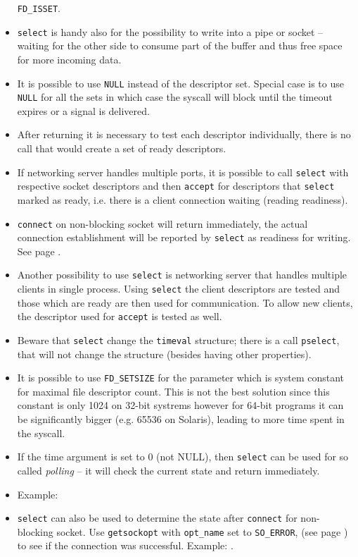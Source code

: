 \begin{itemize}
\texttt{FD\_ISSET}.
\item \texttt{select} is handy also for the possibility to write into a pipe or
socket -- waiting for the other side to consume part of the buffer and thus free
space for more incoming data.
\item It is possible to use \texttt{NULL} instead of the descriptor set. Special
case is to use \texttt{NULL} for all the sets in which case the syscall will
block until the timeout expires or a signal is delivered.
\item After returning it is necessary to test each descriptor individually,
there is no call that would create a set of ready descriptors.
\item If networking server handles multiple ports, it is possible to call
\texttt{select} with respective socket descriptors and then \texttt{accept}
for descriptors that \texttt{select} marked as ready, i.e. there is a client
connection waiting (reading readiness).
\item \texttt{connect} on non-blocking socket will return immediately, the
actual connection establishment will be reported by \texttt{select} as readiness
for writing. See page \pageref{CONNECT}.
\item Another possibility to use \texttt{select} is networking server that
handles multiple clients in single process. Using \texttt{select} the client
descriptors are tested and those which are ready are then used for
communication. To allow new clients, the descriptor used for \texttt{accept} is
tested as well.
\item Beware that \texttt{select}  change the \texttt{timeval}
structure; there is a call \texttt{pselect}, that will not change the structure
(besides having other properties).
\item It is possible to use \texttt{FD\_SETSIZE} for the  parameter
which is system constant for maximal file descriptor count. This is not the best
solution since this constant is only 1024 on 32-bit systrems however for 64-bit
programs it can be significantly bigger (e.g. 65536 on Solaris), leading to more
time spent in the syscall.
\item If the time argument is set to 0 (not NULL), then \texttt{select} can be
used for so called \emph{polling} -- it will check the current state and return
immediately.
\item Example: \label{SELECT_C} 
\item \texttt{select} can also be used to determine the state after
\texttt{connect} for non-blocking socket. Use \texttt{getsockopt} with
\texttt{opt\_name} set to \texttt{SO\_ERROR}, (see page \pageref{GETSOCKOPT}) to
see if the connection was successful.
\label{NON_BLOCKING_CONNECT} Example: .


\end{itemize}

